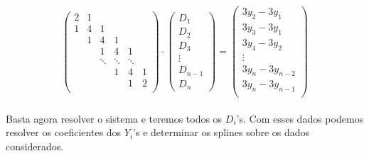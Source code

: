 \begin{equation}
\left(
\begin{array}{llllll}
2 & 1& & & & \\
1 & 4& 1& & & \\
  & 1 & 4& 1& &  \\
&& 1 & 4& 1&  \\
 & & \ddots& \ddots&\ddots & \\
  &&& 1 & 4& 1  \\
  &  & & & 1&2  \\
\end{array} \right)
\cdot
\left(
\begin{array}{c}
D_1 \\
D_2 \\
D_3 \\
\vdots \\
D_{n-1} \\
D_{n} 
\end{array} \right)
=
\left(
\begin{array}{c}
3y_2 - 3y_1 \\
3y_3 - 3y_1 \\
3y_4 - 3y_2 \\
\vdots \\
3y_n - 3y_{n-2} \\
3y_n - 3y_{n-1} \\
\end{array} \right)
\end{equation}  

\paragraph{}Basta agora resolver o sistema e teremos todos os $D_i$'s. 
Com esses dados podemos resolver os coeficientes dos $Y_i$'s e determinar
os splines sobre os dados considerados.
